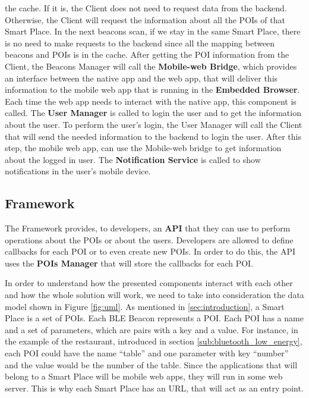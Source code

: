 the cache. If it is, the Client does not need to request
data from the backend. Otherwise, the Client will
request the information about all the POIs of that
Smart Place. In the next beacons scan, if we stay in
the same Smart Place, there is no need to make requests
to the backend since all the mapping between beacons
and POIs is in the cache.
After getting the POI information from the Client,
the Beacons Manager will call the \textbf{Mobile-web Bridge},
which provides an interface between the native app
and the web app, that will deliver this information
to the mobile web app that is running in the
\textbf{Embedded Browser}. 
Each time the web app needs to interact
with the native app, this component is called.
The \textbf{User Manager} is called to login the
user and to get the information about the user. 
To perform the user's login, the User Manager
will call the Client that will send the needed information
to the backend to login the user. After this step,
the mobile web app, can use the Mobile-web bridge
to get information about the logged in user.
The \textbf{Notification Service} is called to
show notifications in the user's mobile device.

\subsection{Framework}
\label{sub:framework}
The Framework provides, to developers, an \textbf{API} that they
can use to perform operations about the POIs or about the users.
Developers are allowed to define callbacks for each POI or to
even create new POIs. In order to do this, the API
uses the \textbf{POIs Manager} that will store the callbacks
for each POI.

In order to understand how the presented components
interact with each other and how the whole solution will
work, we need to take into consideration the data model
shown in Figure \ref{fig:uml}.
As mentioned in \ref{sec:introduction}, a Smart Place
is a set of POIs. Each BLE Beacon represents a POI.
Each POI has a name and a set of parameters, which are
pairs with a key and a value.
For instance, in the example of the restaurant,
introduced in section \ref{sub:bluetooth_low_energy},
each POI could have the name ``table'' and one 
parameter with key ``number'' and the value would
be the number of the table. Since the applications
that will belong to a Smart Place will be
mobile web apps, they will run in some web
server. This is why each Smart Place has an URL,
that will act as an entry point.

